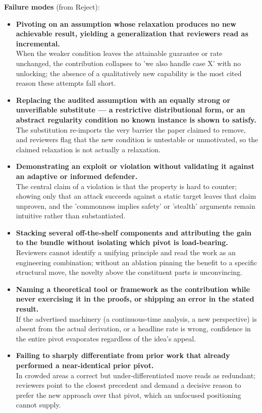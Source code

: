 \begin{tcolorbox}
\begin{itemize}[leftmargin=12pt,topsep=2pt,itemsep=2pt]
\end{itemize}
\textbf{Failure modes} (from Reject):
\begin{itemize}[leftmargin=12pt,topsep=2pt,itemsep=2pt]
  \item \textbf{Pivoting on an assumption whose relaxation produces no new achievable result, yielding a generalization that reviewers read as incremental.} \\ When the weaker condition leaves the attainable guarantee or rate unchanged, the contribution collapses to 'we also handle case X' with no unlocking; the absence of a qualitatively new capability is the most cited reason these attempts fall short.
  \item \textbf{Replacing the audited assumption with an equally strong or unverifiable substitute --- a restrictive distributional form, or an abstract regularity condition no known instance is shown to satisfy.} \\ The substitution re-imports the very barrier the paper claimed to remove, and reviewers flag that the new condition is untestable or unmotivated, so the claimed relaxation is not actually a relaxation.
  \item \textbf{Demonstrating an exploit or violation without validating it against an adaptive or informed defender.} \\ The central claim of a violation is that the property is hard to counter; showing only that an attack succeeds against a static target leaves that claim unproven, and the 'commonness implies safety' or 'stealth' arguments remain intuitive rather than substantiated.
  \item \textbf{Stacking several off-the-shelf components and attributing the gain to the bundle without isolating which pivot is load-bearing.} \\ Reviewers cannot identify a unifying principle and read the work as an engineering combination; without an ablation pinning the benefit to a specific structural move, the novelty above the constituent parts is unconvincing.
  \item \textbf{Naming a theoretical tool or framework as the contribution while never exercising it in the proofs, or shipping an error in the stated result.} \\ If the advertised machinery (a continuous-time analysis, a new perspective) is absent from the actual derivation, or a headline rate is wrong, confidence in the entire pivot evaporates regardless of the idea's appeal.
  \item \textbf{Failing to sharply differentiate from prior work that already performed a near-identical prior pivot.} \\ In crowded areas a correct but under-differentiated move reads as redundant; reviewers point to the closest precedent and demand a decisive reason to prefer the new approach over that pivot, which an unfocused positioning cannot supply.

\end{itemize}
\end{tcolorbox}
